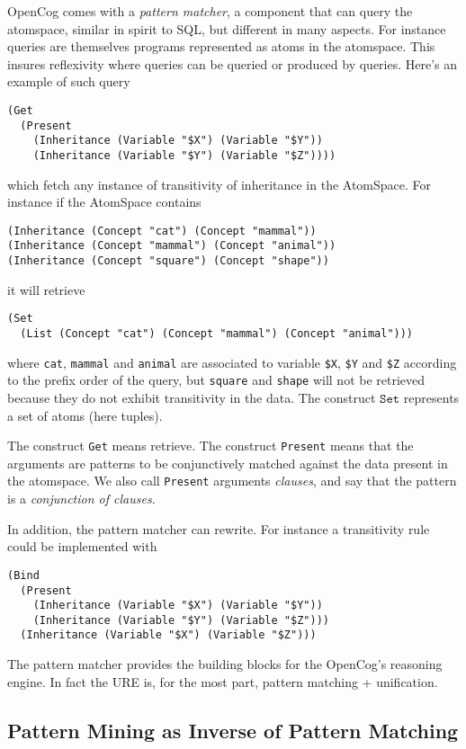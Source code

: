 \documentclass[runningheads]{llncs}
\begin{document}
OpenCog comes with a \emph{pattern matcher}, a component that can
query the atomspace, similar in spirit to SQL, but different in many
aspects. For instance queries are themselves programs represented as
atoms in the atomspace. This insures reflexivity where queries can be
queried or produced by queries. Here's an example of such query
\begin{verbatim}
(Get
  (Present
    (Inheritance (Variable "$X") (Variable "$Y"))
    (Inheritance (Variable "$Y") (Variable "$Z"))))
\end{verbatim}
which fetch any instance of transitivity of inheritance in the
AtomSpace. For instance if the AtomSpace contains
\begin{verbatim}
(Inheritance (Concept "cat") (Concept "mammal"))
(Inheritance (Concept "mammal") (Concept "animal"))
(Inheritance (Concept "square") (Concept "shape"))
\end{verbatim}
it will retrieve
\begin{verbatim}
(Set
  (List (Concept "cat") (Concept "mammal") (Concept "animal")))
\end{verbatim}
where \texttt{cat}, \texttt{mammal} and \texttt{animal} are associated
to variable \texttt{\$X}, \texttt{\$Y} and \texttt{\$Z} according to
the prefix order of the query, but \texttt{square} and \texttt{shape}
will not be retrieved because they do not exhibit transitivity in the
data. The construct $\texttt{Set}$ represents a set of atoms (here
tuples).

The construct \texttt{Get} means retrieve. The construct
\texttt{Present} means that the arguments are patterns to be
conjunctively matched against the data present in the atomspace. We
also call \texttt{Present} arguments \emph{clauses}, and say that the
pattern is a \emph{conjunction of clauses}.

In addition, the pattern matcher can rewrite. For instance a
transitivity rule could be implemented with
\begin{verbatim}
(Bind
  (Present
    (Inheritance (Variable "$X") (Variable "$Y"))
    (Inheritance (Variable "$Y") (Variable "$Z")))
  (Inheritance (Variable "$X") (Variable "$Z")))
\end{verbatim}
The pattern matcher provides the building blocks for the OpenCog's
reasoning engine. In fact the URE is, for the most part, pattern
matching + unification.

\subsection{Pattern Mining as Inverse of Pattern Matching}
\end{document}

